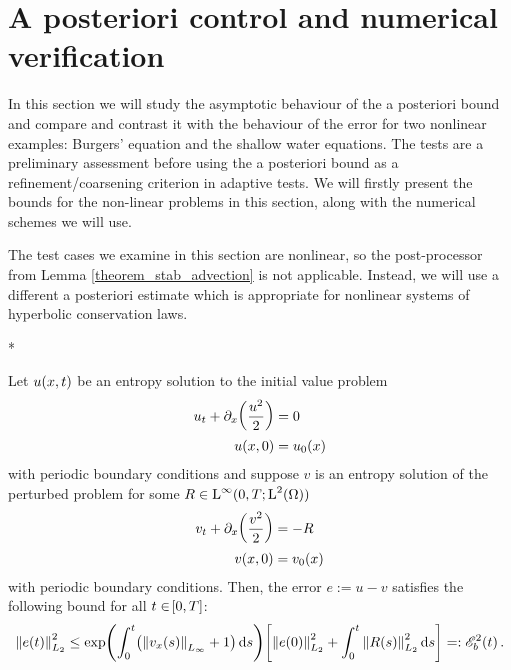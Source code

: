 \documentclass[final]{amsart}
\numberwithin{equation}{section}
\begin{document}
\section{A posteriori control and numerical verification}\label{sec:numerical_verification}
In this section we will study the asymptotic behaviour of the a
posteriori bound and compare and contrast it with the behaviour of the
error for two nonlinear examples: Burgers' equation and the shallow
water equations. The tests are a preliminary assessment before
using the a posteriori bound as a
refinement/coarsening criterion in adaptive tests.  We will firstly
present the bounds for the non-linear problems  in this section, along with the numerical schemes we will
use.
\begin{Rem}
 The test cases we examine in this section are nonlinear, so the
 post-processor from Lemma \ref{theorem_stab_advection} is not
 applicable.  Instead, we will use a different a posteriori estimate
 which is appropriate for nonlinear systems of hyperbolic conservation
 laws.
\end{Rem}
\/*
\begin{Lem}\label{theorem_stab_burgers}
Let $u\!\left({x,t}\right)$ be an entropy solution to the initial value problem 
\begin{equation}
\begin{aligned}
u_t+\partial_x\!\left({\frac{u^2}{2}}\right)&=0\\
u\!\left({x,0}\right)&=u_0\!\left({x}\right)
\end{aligned}
\end{equation}
with periodic boundary conditions and suppose $v$ is an entropy
solution of the perturbed problem for some $R \in \operatorname L^{\infty}(0,T;
\operatorname L^{2}(\Omega))$
\begin{equation}
\begin{aligned}
v_t+\partial_x\!\left({\frac{v^2}{2}}\right)&=-R\\
v\!\left({x,0}\right)&=v_0\!\left({x}\right)
\end{aligned}
\end{equation}
with periodic boundary conditions. Then, the error $e:=u-v$ satisfies
the following bound for all $t\in\!\left[{0,T}\right]$:
\begin{equation}
\begin{aligned}
\Norm{e\qp{t}}^2_{L_2}\leq \exp\qp{\int_0^t\qp{\Norm{v_x\qp{s}}_{L_\infty}+1}\mathrm{d}s}\qb{\Norm{e\qp{0}}_{L_2}^2+\int_0^t\Norm{R\qp{s}}^2_{L_2}\mathrm{d}s}=: \cE_b^2\qp{t}.
\end{aligned}
\end{equation}
\end{Lem}
\end{document}
